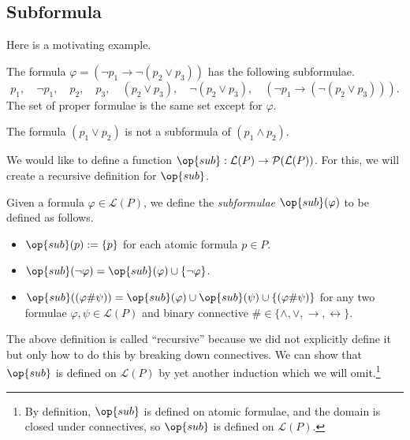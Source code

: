 \subsection{Subformula}
Here is a motivating example.
\begin{example}
	The formula $\varphi=(\lnot p_1\to\lnot(p_2\lor p_3))$ has the following subformulae.
	\[p_1,\quad\lnot p_1,\quad p_2,\quad p_3,\quad(p_2\lor p_3),\quad\lnot(p_2\lor p_3),\quad(\lnot p_1\to(\lnot(p_2\lor p_3))).\]
	The set of proper formulae is the same set except for $\varphi$.
\end{example}
\begin{nex}
	The formula $(p_1\lor p_2)$ is not a subformula of $(p_1\land p_2)$.
\end{nex}
We would like to define a function $\op{sub}:\mathcal L(P)\to\mathcal P(\mathcal L(P))$. For this, we will create a recursive definition for $\op{sub}$.
\begin{definition}[Subformula]
	Given a formula $\varphi\in\mathcal L(P)$, we define the \textit{subformulae} $\op{sub}(\varphi)$ to be defined as follows.
	\begin{itemize}
		\item $\op{sub}(p):=\{p\}$ for each atomic formula $p\in P$.
		\item $\op{sub}(\lnot\varphi)=\op{sub}(\varphi)\cup\{\lnot\varphi\}$.
		\item $\op{sub}((\varphi\#\psi))=\op{sub}(\varphi)\cup\op{sub}(\psi)\cup\{(\varphi\#\psi)\}$ for any two formulae $\varphi,\psi\in\mathcal L(P)$ and binary connective $\#\in\{\land,\lor,\to,\leftrightarrow\}$.
	\end{itemize}
\end{definition}
The above definition is called ``recursive'' because we did not explicitly define it but only how to do this by breaking down connectives. We can show that $\op{sub}$ is defined on $\mathcal L(P)$ by yet another induction which we will omit.\footnote{By definition, $\op{sub}$ is defined on atomic formulae, and the domain is closed under connectives, so $\op{sub}$ is defined on $\mathcal L(P)$.}

